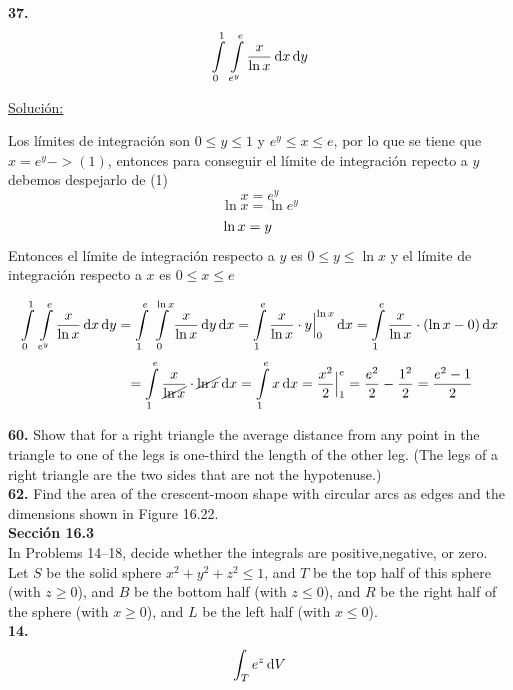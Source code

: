 \documentclass[11pt]{report}
\newcommand{\s}{\underline{Soluci\'{o}n:}}
\begin{document}
\textbf{37.} \\

\[ \int \limits_0^1 \, \int \limits_{e^y}^e \frac{x}{\ln{x}} \, \text dx \,
   \text dy \]

\s

Los l\'{i}mites de integraci\'{o}n son $0 \leq y \leq 1$ y $e^y \leq x \leq e$,
por lo que se tiene que $x = e^y -> (1)$, entonces para conseguir el l\'{i}mite de
integraci\'{o}n repecto a $y$ debemos despejarlo de (1)
\[x = e^y\]
\[\ln x = \ln e^y\]
\[\hspace{-0.6cm}\ln x = y\]
Entonces el l\'{i}mite de integraci\'{o}n respecto a $y$ es $0 \leq y \leq \ln x$
y el l\'{i}mite de integraci\'{o}n respecto a $x$ es $0 \leq x \leq e$

\[\int \limits_0^1 \, \int \limits_{e^y}^e \frac{x}{\ln{x}} \, \text dx \,
   \text dy  =
   \int \limits_1^e \, \int \limits_{0}^{\ln{x}} \frac{x}{\ln{x}} \, \text dy \,
      \text dx
  = \int \limits_1^e \frac{x}{\ln{x}} \cdot y  \Big|^{\ln{x}}_{0}\,\text dx
  = \int \limits_1^e \frac{x}{\ln{x}} \cdot (\ln x - 0) \, \text dx\]
\[\hspace{2.1cm} = \int \limits_1^e \frac{x}{\cancel{\ln{x}}} \cdot \cancel{\ln{x}}\,\text dx
  = \int \limits_1^e x \, \text dx
  = \frac{x^2}{2}\Big|^{e}_{1}
  = \frac{e^2}{2} - \frac{1^2}{2}
  = \frac{e^2-1}{2}\]

\textbf{60.} Show that for a right triangle the average distance from any point
in the triangle to one of the legs is one-third the length of the other leg.
(The legs of a right triangle are the two sides that are not the hypotenuse.) \\

\textbf{62.} Find the area of the crescent-moon shape with circular arcs as edges
and the dimensions shown in Figure 16.22. \\

\textbf{Sección 16.3} \\

In Problems 14–18, decide whether the integrals are positive,negative, or zero.
Let $S$ be the solid sphere $x^2 + y^2 + z^2 \leq 1$, and $T$ be the top half of
this sphere (with $z \geq 0$), and $B$ be the bottom half (with $z \leq 0$), and $R$
be the right half of the sphere (with $x \geq 0$), and $L$ be the left half
(with $x \leq 0$). \\

\textbf{14.} \\

\[ \int _T e^z \, \text dV \]
\end{document}
